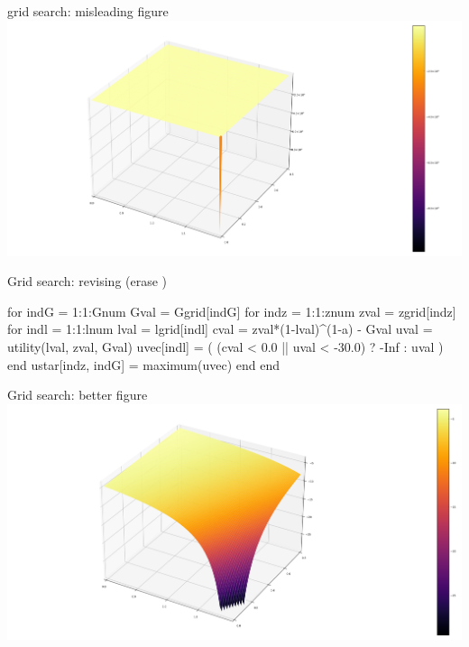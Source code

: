 \documentclass[11pt,aspectratio=43,usenames,dvipsnames]{beamer}
\theoremstyle{definition}
\begin{document}
\begin{frame}{grid search: misleading figure}
\label{slide:grid_search__misleading_figure}
    \includegraphics[width=\textwidth]{./figures/utilitygov_wrong.png}
\end{frame}

\begin{frame}[fragile]{Grid search: revising (erase )}
\label{slide:Grid_search__structure__cont__}
\begin{juliacode}
    for indG = 1:1:Gnum
        Gval = Ggrid[indG]
        for indz = 1:1:znum
            zval = zgrid[indz]
            for indl = 1:1:lnum
                lval = lgrid[indl]
                cval = zval*(1-lval)^(1-a) - Gval
                uval = utility(lval, zval, Gval)
                uvec[indl] = ( (cval < 0.0 || uval < -30.0)
                                ? -Inf : uval )
            end
            ustar[indz, indG] = maximum(uvec)
        end
    end
\end{juliacode}

\end{frame}

\begin{frame}{Grid search: better figure}
\label{slide:grid_search__better_figure}
    \includegraphics[width=\textwidth]{./figures/utilitygov_correct.png}
\end{frame}
\end{document}
